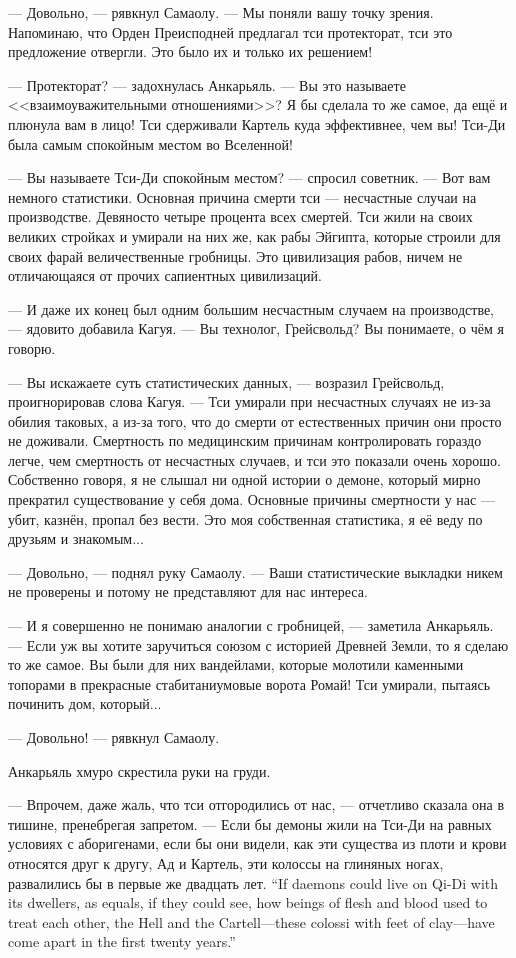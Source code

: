 --- Довольно, --- рявкнул Самаолу.
--- Мы поняли вашу точку зрения.
Напоминаю, что Орден Преисподней предлагал тси протекторат, тси это предложение отвергли.
Это было их и только их решением!

--- Протекторат? --- задохнулась Анкарьяль.
--- Вы это называете <<взаимоуважительными отношениями>>?
Я бы сделала то же самое, да ещё и плюнула вам в лицо!
Тси сдерживали Картель куда эффективнее, чем вы!
Тси-Ди была самым спокойным местом во Вселенной!

--- Вы называете Тси-Ди спокойным местом? --- спросил советник.
--- Вот вам немного статистики. Основная причина смерти тси --- несчастные случаи на производстве.
Девяносто четыре процента всех смертей.
Тси жили на своих великих стройках и умирали на них же, как рабы Эйгипта, которые строили для своих фарай величественные гробницы.
Это цивилизация рабов, ничем не отличающаяся от прочих сапиентных цивилизаций.

--- И даже их конец был одним большим несчастным случаем на производстве, --- ядовито добавила Кагуя.
--- Вы технолог, Грейсвольд?
Вы понимаете, о чём я говорю.

--- Вы искажаете суть статистических данных, --- возразил Грейсвольд, проигнорировав слова Кагуя.
--- Тси умирали при несчастных случаях не из-за обилия таковых, а из-за того, что до смерти от естественных причин они просто не доживали.
Смертность по медицинским причинам контролировать гораздо легче, чем смертность от несчастных случаев, и тси это показали очень хорошо.
Собственно говоря, я не слышал ни одной истории о демоне, который мирно прекратил существование у себя дома.
Основные причины смертности у нас --- убит, казнён, пропал без вести.
Это моя собственная статистика, я её веду по друзьям и знакомым...

--- Довольно, --- поднял руку Самаолу.
--- Ваши статистические выкладки никем не проверены и потому не представляют для нас интереса.

--- И я совершенно не понимаю аналогии с гробницей, --- заметила Анкарьяль.
--- Если уж вы хотите заручиться союзом с историей Древней Земли, то я сделаю то же самое.
Вы были для них вандейлами, которые молотили каменными топорами в прекрасные стабитаниумовые ворота Ромай!
Тси умирали, пытаясь починить дом, который...

--- Довольно! --- рявкнул Самаолу.

Анкарьяль хмуро скрестила руки на груди.

--- Впрочем, даже жаль, что тси отгородились от нас, --- отчетливо сказала она в тишине, пренебрегая запретом.
{--- Если бы демоны жили на Тси-Ди на равных условиях с аборигенами, если бы они видели, как эти существа из плоти и крови относятся друг к другу, Ад и Картель, эти колоссы на глиняных ногах, развалились бы в первые же двадцать лет.}
{``If daemons could live on Qi-Di with its dwellers, as equals, if they could see, how beings of flesh and blood used to treat each other, the Hell and the Cartell---these colossi with feet of clay---have come apart in the first twenty years.''}

